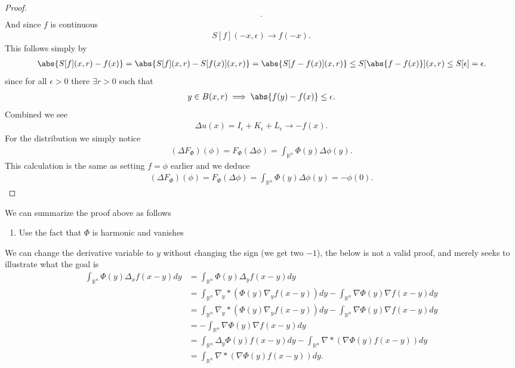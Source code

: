 \begin{proof}
\begin{align*}
  .\end{align*}
 And since $f$ is continuous
 \begin{align*}
   S[f](-x,\epsilon) \to f(-x)
 .\end{align*}
 This follows simply by
 \begin{align*}
   \abs{S[f](x,r) - f(x)} = \abs{S[f](x,r) - S[f(x)](x,r)} = \abs{S[f-f(x)](x,r)} \le  S[\abs{f-f(x)}](x,r) \le S[\epsilon] = \epsilon
 .\end{align*}
 since for all $\epsilon >0$ there $\exists  r >0$ such that
 \begin{align*}
  y \in  B(x,r)  \implies \abs{f(y)-f(x)} \le  \epsilon
 .\end{align*}
 Combined we see 
 \begin{align*}
  \Delta  u(x) = I_\epsilon + K_\epsilon + L_\epsilon \to  -f(x)
 .\end{align*}
 For the distribution we simply notice 
 \begin{align*}
   (\Delta  F_{\Phi })(\phi ) = F_{\Phi }(\Delta  \phi ) = \int_{\mathbb{R}^{n} } \Phi(y) \Delta \phi(y)
 .\end{align*}
 This calculation is the same as setting $f = \phi $ earlier and we deduce 
 \begin{align*}
    (\Delta  F_{\Phi })(\phi ) = F_{\Phi }(\Delta  \phi ) = \int_{\mathbb{R}^{n} } \Phi(y) \Delta \phi(y) = -\phi(0)
 .\end{align*}
\end{proof}
\begin{corollary}
 We can summarize the proof above as follows 
 \begin{enumerate}
  \item Use the fact that $\Phi$ is harmonic and vanishes
 \end{enumerate}
 We can change the derivative variable to $y$ without changing the sign (we get two $-1$),
 the below is not a valid proof, and merely seeks to illustrate what the goal is
 \begin{align*}
   \int_{\mathbb{R}^{n} }\Phi(y)\Delta_x f(x-y)dy &= \int_{\mathbb{R}^{n} }\Phi(y)\Delta_y f(x-y)dy\\
                                                  &= \int_{\mathbb{R}^{n} } \nabla_y * (\Phi(y) \nabla_y f(x-y)) dy - \int_{\mathbb{R}^{n} }\nabla \Phi(y) \nabla f(x-y) dy \\
                                                  &=  \int_{\mathbb{R}^{n} } \nabla_y * (\Phi(y) \nabla_y f(x-y)) dy - \int_{\mathbb{R}^{n} }\nabla \Phi(y) \nabla f(x-y) dy \\
                                                  &= - \int_{\mathbb{R}^{n} }\nabla \Phi(y) \nabla f(x-y) dy\\
                                                  &=  \int_{\mathbb{R}^{n} } \Delta_y \Phi(y) f(x-y) dy - \int_{\mathbb{R}^{n} } \nabla * (\nabla \Phi(y) f(x-y)) dy \\
                                                  &= \int_{\mathbb{R}^{n} } \nabla * (\nabla \Phi(y) f(x-y)) dy
 .\end{align*}
\end{corollary}
